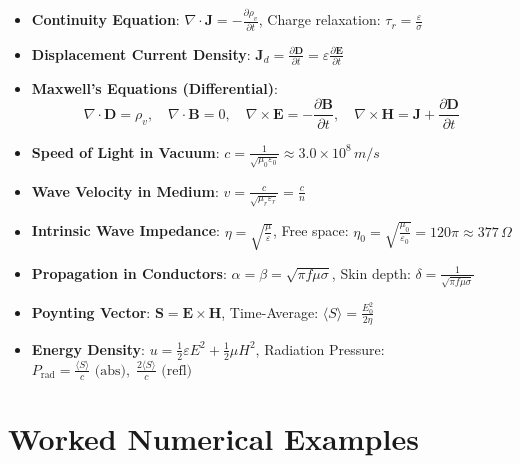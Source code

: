 \begin{quickrevision}
\begin{itemize}
    \item \textbf{Continuity Equation}: $\nabla \cdot \mathbf{J} = -\frac{\partial \rho_v}{\partial t}$, \quad Charge relaxation: $\tau_r = \frac{\varepsilon}{\sigma}$
    \item \textbf{Displacement Current Density}: $\mathbf{J}_d = \frac{\partial \mathbf{D}}{\partial t} = \varepsilon \frac{\partial \mathbf{E}}{\partial t}$
    \item \textbf{Maxwell's Equations (Differential)}:
    \begin{equation*}
        \nabla \cdot \mathbf{D} = \rho_v, \quad \nabla \cdot \mathbf{B} = 0, \quad \nabla \times \mathbf{E} = -\frac{\partial \mathbf{B}}{\partial t}, \quad \nabla \times \mathbf{H} = \mathbf{J} + \frac{\partial \mathbf{D}}{\partial t}
    \end{equation*}
    \item \textbf{Speed of Light in Vacuum}: $c = \frac{1}{\sqrt{\mu_0 \varepsilon_0}} \approx 3.0 \times 10^8\,\si{m/s}$
    \item \textbf{Wave Velocity in Medium}: $v = \frac{c}{\sqrt{\mu_r \varepsilon_r}} = \frac{c}{n}$
    \item \textbf{Intrinsic Wave Impedance}: $\eta = \sqrt{\frac{\mu}{\varepsilon}}$, \quad Free space: $\eta_0 = \sqrt{\frac{\mu_0}{\varepsilon_0}} = 120\pi \approx 377\,\Omega$
    \item \textbf{Propagation in Conductors}: $\alpha = \beta = \sqrt{\pi f \mu \sigma}$, \quad Skin depth: $\delta = \frac{1}{\sqrt{\pi f \mu \sigma}}$
    \item \textbf{Poynting Vector}: $\mathbf{S} = \mathbf{E} \times \mathbf{H}$, \quad Time-Average: $\langle S \rangle = \frac{E_0^2}{2\eta}$
    \item \textbf{Energy Density}: $u = \frac{1}{2}\varepsilon E^2 + \frac{1}{2}\mu H^2$, \quad Radiation Pressure: $P_{\text{rad}} = \frac{\langle S \rangle}{c} \text{ (abs)}, \; \frac{2\langle S \rangle}{c} \text{ (refl)}$
\end{itemize}
\end{quickrevision}

\section{Worked Numerical Examples}

